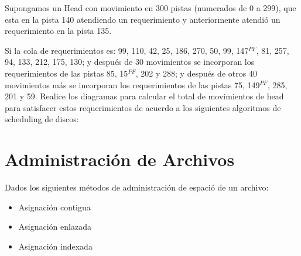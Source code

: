 \begin{questions}
\question Supongamos un Head con movimiento en 300 pistas (numerados de 0 a 299), que esta en la pista 140 atendiendo un requerimiento y anteriormente atendió un requerimiento en la pista 135.

\hspace{20pt} Si la cola de requerimientos es: 99, 110, 42, 25, 186, 270, 50, 99, 147$^{PF}$, 81, 257, 94, 133, 212, 175, 130; y después de 30 movimientos se incorporan los requerimientos de las pistas 85, 15$^{PF}$, 202 y 288; y después de otros 40 movimientos más se incorporan los requerimientos de las pistas 75, 149$^{PF}$, 285, 201 y 59. Realice los diagramas para calcular el total de movimientos de head para satisfacer estos requerimientos de acuerdo a los siguientes algoritmos de scheduling de discos:

\section{Administración de Archivos}

\question Dados los siguientes métodos de administración de espació de un archivo:
\begin{itemize}
	\item Asignación contigua
	\item Asignación enlazada
	\item Asignación indexada
\end{itemize}
\begin{parts}

\end{parts}
\end{questions}
